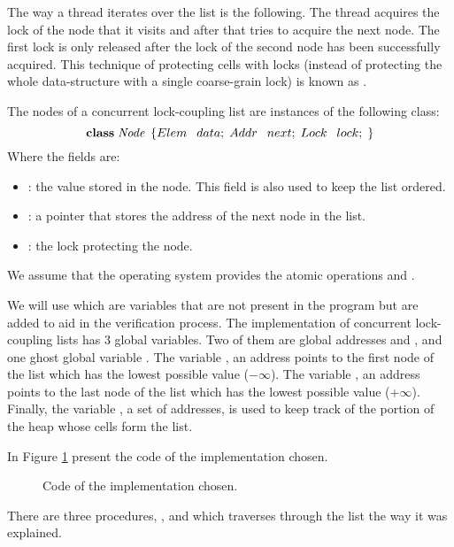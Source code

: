 The way a thread iterates over the list is the following.
%
The thread acquires the lock of the node
that it visits and after that tries to acquire the next node.
The first lock is only released after the lock of the
second node has been successfully acquired.
%
This technique of protecting cells with locks (instead of protecting
the whole data-structure with a single coarse-grain lock) is known as
.


The nodes of a concurrent lock-coupling list are instances of the following 
\ListNode class:
%
\[
	  \textbf{class} \;\mathit{Node}  \;\left\{
				Elem \:\;\; data; \;
				Addr \:\;\; next; \;
				Lock \:\;\; lock; \;
		\right\}
\]
%
Where the fields are:
\begin{itemize}
		\item \fData: the value stored in the node. This field is also used to keep 
			the list ordered.
		\item \fNext: a pointer that stores the address of the next node in 
			the list.
		\item \fLock: the lock protecting the node.
\end{itemize}

We assume that the operating system provides the atomic operations \fLock 
and \fUnlock. 

We will use  which are variables that are not present in the program but are added to aid in the verification process.
%
The implementation of concurrent lock-coupling lists has 3 global variables.
%
Two of them are global addresses \head and \tail, and one ghost global variable \region.
The variable \head, an address points to the first node of the list which has the lowest possible value ($-\infty$).
%
The variable \tail, an address points to the last node of the list  which has the lowest possible value ($+\infty$).
%
Finally, the variable \region, a set of addresses, is used to keep track of the portion of the heap whose cells form the list.

In Figure \ref{fig:listcode} present the code of the implementation chosen.



\begin{figure}
	\centering	
	\label{fig:listcode}
	\caption{Code of the implementation chosen.}
\end{figure}
%
There are three procedures, \Search, \Insert and \Remove which traverses through the list the way it was explained.



